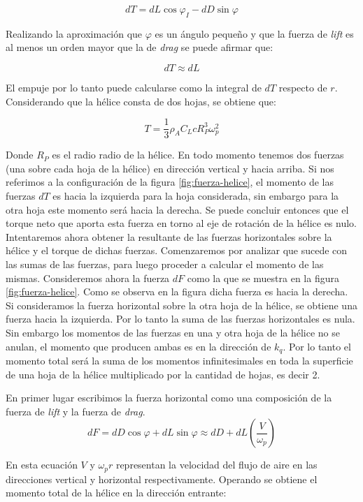 \documentclass[main]{subfiles}
\begin{document}
$$dT=dL\cos\varphi_I-dD\sin\varphi$$

Realizando la aproximaci\'on que $\varphi$ es un \'angulo peque\~no y que la fuerza de \emph{lift} es al menos un orden mayor que la de \emph{drag} se puede afirmar que:

$$dT\approx dL
$$

El empuje por lo tanto puede calcularse como la integral de $dT$ respecto de $r$. Considerando que la h\'elice consta de dos hojas, se obtiene que:

\begin{equation}
\label{eq:fuerza}
T=\frac{1}{3}\rho_A C_L c R_P^3\omega_p^2
\end{equation}


Donde $R_P$ es el radio radio de la h\'elice. En todo momento tenemos dos fuerzas (una sobre cada hoja de la h\'elice) en direcci\'on vertical y hacia arriba. Si nos referimos a la configuraci\'on de la figura \ref{fig:fuerza-helice}, el momento de las fuerzas $dT$ es hacia la izquierda para la hoja considerada, sin embargo para la otra hoja este momento ser\'a hacia la derecha. Se puede concluir entonces que el torque neto que aporta esta fuerza en torno al eje de rotaci\'on de la h\'elice es nulo.\\   

Intentaremos ahora obtener la resultante de las fuerzas horizontales sobre la h\'elice y el torque de dichas fuerzas. Comenzaremos por analizar que sucede con las sumas de las fuerzas, para luego proceder a calcular el momento de las mismas. Consideremos ahora la fuerza $dF$ como la que se muestra en la figura \ref{fig:fuerza-helice}. Como se observa en la figura dicha fuerza es hacia la derecha. Si consideramos la fuerza horizontal sobre la otra hoja de la h\'elice, se obtiene una fuerza hacia la izquierda. Por lo tanto la suma de las fuerzas horizontales es nula. Sin embargo los momentos de las fuerzas en una y otra hoja de la h\'elice no se anulan, el momento que producen ambas es en la direcci\'on de $k_q$. Por lo tanto el momento total ser\'a la suma de los momentos infinitesimales en toda la superficie de una hoja de la h\'elice multiplicado por la cantidad de hojas, es decir 2. 

En primer lugar escribimos la fuerza horizontal como una composici\'on de la fuerza de \emph{lift} y la fuerza de \emph{drag}. 
$$dF=dD\cos\varphi+dL\sin\varphi \approx dD +dL\left(\frac{V}{\omega_p}\right)$$

En esta ecuaci\'on $V$ y $\omega_p r$ representan la velocidad del flujo de aire en las direcciones vertical y horizontal respectivamente. Operando se obtiene el momento total de la h\'elice en la direcci\'on entrante:
\end{document}
